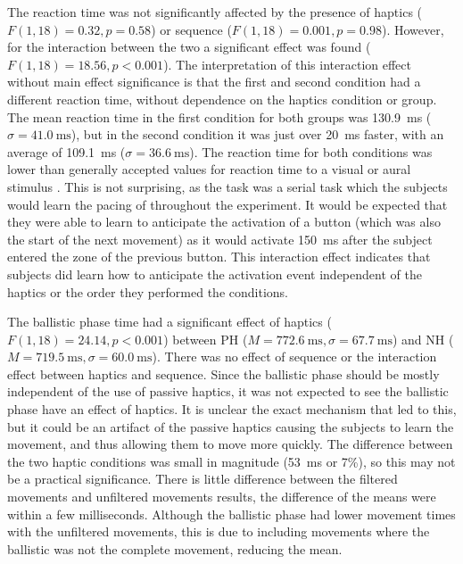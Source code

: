 The reaction time was not significantly affected by the presence of haptics ($F(1,18)=0.32, p=0.58$) or sequence ($F(1,18)=0.001, p=0.98$).
However, for the interaction between the two a significant effect was found ($F(1,18)=18.56, p<0.001$).
The interpretation of this interaction effect without main effect significance is that the first and second condition had a different reaction time, without dependence on the haptics condition or group.
The mean reaction time in the first condition for both groups was \SI{130.9}{\milli\second} ($\sigma=\SI{41.0}{\milli\second}$), but in the second condition it was just over \SI{20}{\milli\second} faster, with an average of \SI{109.1}{\milli\second} ($\sigma=\SI{36.6}{\milli\second}$).
The reaction time for both conditions was lower than generally accepted values for reaction time to a visual or aural stimulus \citep{teichner_recent_1954}.
This is not surprising, as the task was a serial task which the subjects would learn the pacing of throughout the experiment.
It would be expected that they were able to learn to anticipate the activation of a button (which was also the start of the next movement) as it would activate \SI{150}{\milli\second} after the subject entered the zone of the previous button.
This interaction effect indicates that subjects did learn how to anticipate the activation event independent of the haptics or the order they performed the conditions.

The ballistic phase time had a significant effect of haptics ($F(1, 18)=24.14, p<0.001$) between PH ($M=\SI{772.6}{\milli\second}, \sigma=\SI{67.7}{\milli\second}$) and NH ($M=\SI{719.5}{\milli\second}, \sigma=\SI{60.0}{\milli\second}$).
There was no effect of sequence or the interaction effect between haptics and sequence.
Since the ballistic phase should be mostly independent of the use of passive haptics, it was not expected to see the ballistic phase have an effect of haptics.
It is unclear the exact mechanism that led to this, but it could be an artifact of the passive haptics causing the subjects to learn the movement, and thus allowing them to move more quickly.
The difference between the two haptic conditions was small in magnitude (\SI{53}{\milli\second} or 7\%), so this may not be a practical significance.
There is little difference between the filtered movements and unfiltered movements results, the difference of the means were within a few milliseconds.
Although the ballistic phase had lower movement times with the unfiltered movements, this is due to including movements where the ballistic was not the complete movement, reducing the mean.


